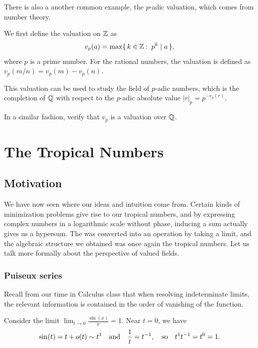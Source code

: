 \documentclass[12pt]{memoir}
\theoremstyle{definition}
\begin{document}
There is also a another common example, the $p$-adic valuation, which comes from number theory.\par
We first define the valuation on $\mathbb{Z}$ as 
$$v_p(a)=\max\set{k\in\bZ\:\ p^k\mid a},$$
 where $p$ is a prime number. For the rational numbers, the valuation is defined as $v_p(m/n)=v_p(m)-v_p(n)$.\par
This valuation can be used to study the field of $p$-adic numbers, which is the completion of $\mathbb{Q}$ with respect to the $p$-adic absolute value $|r|_p=p^{-v_p(r)}$.

\begin{Ej}
In a similar fashion, verify that $v_p$ is a valuation over $\mathbb{Q}$.
\end{Ej}

\chapter{The Tropical Numbers}

\section{Motivation}%

We have now seen where our ideas and intuition come from. Certain kinds of minimization problems give rise to our tropical numbers, and by expressing complex numbers in a logarithmic scale without phase, inducing a sum actually gives us a hypersum. The was converted into an operation by taking a limit, and the algebraic structure we obtained was once again the tropical numbers. Let us talk more formally about the perspective of valued fields.

\subsection{Puiseux series}
Recall from our time in Calculus class that when resolving indeterminate limits, the relevant information is contained in the order of vanishing of the function.

\begin{Ex}
    Consider the limit $\lim_{t\to 0}\frac{\sin(x)}{x}=1$. Near $t=0$, we have 
    $$\sin(t)=t+o(t)\sim t^1\quad\text{and}\quad\frac{1}{t}=t^{-1},\quad\text{so}\quad t^1t^{-1}=t^0=1.$$
\end{Ex}
\end{document}
